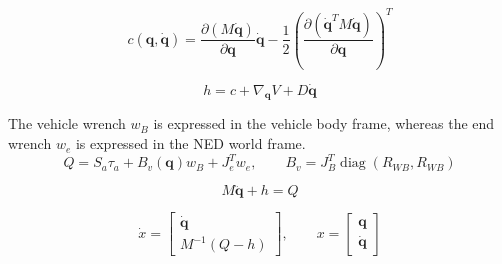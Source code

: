 \documentclass[11pt]{article}
\begin{document}
\begin{equation}
c(\boldsymbol q,\dot{\boldsymbol q})=\frac{\partial(M\dot{\boldsymbol q})}{\partial\boldsymbol q}\dot{\boldsymbol q}-\frac12\left(\frac{\partial(\dot{\boldsymbol q}^{T}M\dot{\boldsymbol q})}{\partial\boldsymbol q}\right)^T
\end{equation}

\begin{equation}
h=c+\nabla_{\boldsymbol q}V+D\dot{\boldsymbol q}
\end{equation}

The vehicle wrench $w_B$ is expressed in the vehicle body frame, whereas the end wrench $w_e$ is expressed in the NED world frame.
\begin{equation}
Q=S_a\tau_a+B_v(\boldsymbol q)w_B+J_e^Tw_e,\qquad B_v=J_B^T\operatorname{diag}(R_{WB},R_{WB})
\end{equation}

\begin{equation}
M\ddot{\boldsymbol q}+h=Q\label{eq:dynamics}
\end{equation}

\begin{equation}
\dot x=\begin{bmatrix}\dot{\boldsymbol q}\\M^{-1}(Q-h)\end{bmatrix},\qquad x=\begin{bmatrix}\boldsymbol q\\\dot{\boldsymbol q}\end{bmatrix}
\end{equation}
\end{document}
